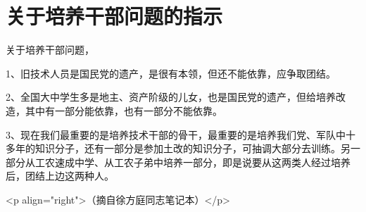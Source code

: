 \section[关于培养干部问题的指示（一九五一年三月）]{关于培养干部问题的指示}


关于培养干部问题，

1、旧技术人员是国民党的遗产，是很有本领，但还不能依靠，应争取团结。

2、全国大中学生多是地主、资产阶级的儿女，也是国民党的遗产，但给培养改造，其中有一部分能依靠，也有一部分不能依靠。

3、现在我们最重要的是培养技术干部的骨干，最重要的是培养我们党、军队中十多年的知识分子，还有一部分是参加土改的知识分子，可抽调大部分去训练。另一部分从工农速成中学、从工农子弟中培养一部分，即是说要从这两类人经过培养后，团结上边这两种人。

<p align="right">（摘自徐方庭同志笔记本）</p>


